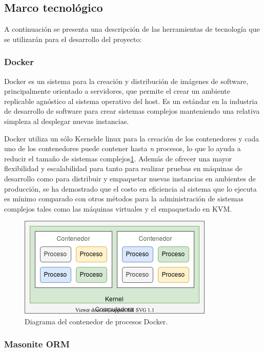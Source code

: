 \subsection{Marco tecnológico}

A continuación se presenta una descripción de las herramientas de tecnología que se utilizarán para el desarrollo del proyecto:

\subsubsection{Docker}

Docker es un sistema para la creación y distribución de imágenes de software, principalmente orientado a servidores, que permite el crear un ambiente replicable agnóstico al sistema operativo del host. Es un estándar en la industria de desarrollo de software para crear sistemas complejos manteniendo una relativa simpleza al desplegar nuevas instancias\cite{rad2017dockerAnalysis}.

Docker utiliza un sólo Kernelde linux para la creación de los contenedores y cada uno de los contenedores puede contener hasta \textit{n} procesos, lo que lo ayuda a reducir el tamaño de sistemas complejos\ref{fig:docker_diagrama}. Además de ofrecer una mayor flexibilidad y escalabilidad para tanto para realizar pruebas en máquinas de desarrollo como para distribuir y empaquetar nuevas instancias en ambientes de producción, se ha demostrado que el costo en eficiencia al sistema que lo ejecuta es mínimo comparado con otros métodos para la administración de sistemas complejos tales como las máquinas virtuales y el empaquetado en KVM\cite{rad2017dockerAnalysis, felter2015comparsionPerformance}.


\begin{figure}[!ht]
	\centering
	\includegraphics[width=.45\linewidth]{images/diagrams/docker.png}
	\caption{Diagrama del contenedor de procesos Docker.}
	\label{fig:docker_diagrama}
\end{figure}

\subsubsection{Masonite ORM}

